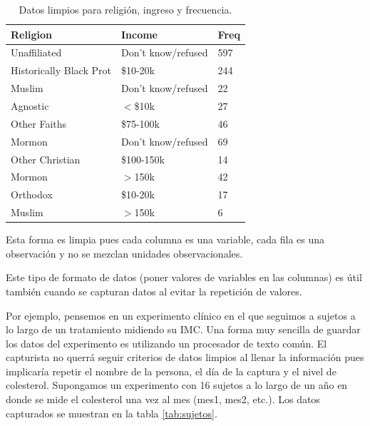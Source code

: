 \documentclass[]{article}
\begin{document}
\begin{table}[ht]
\centering
\begin{tabular}{lll}
  \hline
Religion & Income & Freq \\ 
  \hline
Unaffiliated & Don't know/refused & 597 \\ 
  Historically Black Prot & \$10-20k & 244 \\ 
  Muslim & Don't know/refused & 22 \\ 
  Agnostic & $<$\$10k & 27 \\ 
  Other Faiths & \$75-100k & 46 \\ 
  Mormon & Don't know/refused & 69 \\ 
  Other Christian & \$100-150k & 14 \\ 
  Mormon & $>$150k & 42 \\ 
  Orthodox & \$10-20k & 17 \\ 
  Muslim & $>$150k & 6 \\ 
   \hline
\end{tabular}
\caption{Datos limpios para religión, ingreso y frecuencia.} 
\label{tab:ej1limpio}
\end{table}

\begin{nota}[Nota] 
Esta forma es limpia pues cada columna es una variable, cada fila es una observación
y no se mezclan unidades observacionales.
\end{nota}

Este tipo de formato de datos (poner valores de variables en las
columnas) es útil también cuando se capturan datos al evitar la
repetición de valores.

Por ejemplo, pensemos en un experimento clínico en el que seguimos a
sujetos a lo largo de un tratamiento midiendo su IMC. Una forma muy
sencilla de guardar los datos del experimento es utilizando un
procesador de texto común. El capturista no querrá seguir criterios de
datos limpios al llenar la información pues implicaría repetir el nombre
de la persona, el día de la captura y el nivel de colesterol. Supongamos
un experimento con 16 sujetos a lo largo de un año en donde se mide el
colesterol una vez al mes (mes1, mes2, etc.). Los datos capturados se
muestran en la tabla \ref{tab:sujetos}.
\end{document}
